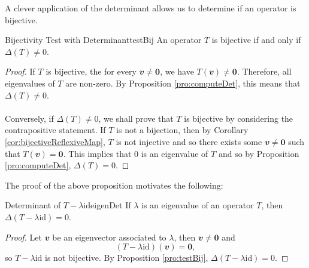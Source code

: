 \documentclass[math, code]{amznotes}
\theoremstyle{remark}
\newcommand{\zero}{\mathbf{0}}
\begin{document}
A clever application of the determinant allows us to determine if an operator is bijective.
\begin{probox}{Bijectivity Test with Determinant}{testBij}
    An operator $T$ is bijective if and only if $\Delta(T) \neq 0$.
    \tcblower
    \begin{proof}
        If $T$ is bijective, the for every $\mathbfit{v} \neq \zero$, we have $T(\mathbfit{v}) \neq \zero$. Therefore, all eigenvalues of $T$ are non-zero. By Proposition \ref{pro:computeDet}, this means that $\Delta(T) \neq 0$.
        \\\\
        Conversely, if $\Delta(T) \neq 0$, we shall prove that $T$ is bijective by considering the contrapositive statement. If $T$ is not a bijection, then by Corollary \ref{cor:bijectiveReflexiveMap}, $T$ is not injective and so there exists some $\mathbfit{v} \neq \zero$ such that $T(\mathbfit{v}) = \zero$. This implies that $0$ is an eigenvalue of $T$ and so by Proposition \ref{pro:computeDet}, $\Delta(T) = 0$.
    \end{proof}
\end{probox}
The proof of the above proposition motivates the following:
\begin{corbox}{Determinant of $T - \lambda\mathrm{id}$}{eigenDet}
    If $\lambda$ is an eigenvalue of an operator $T$, then $\Delta(T - \lambda\mathrm{id}) = 0$.
    \tcblower
    \begin{proof}
        Let $\mathbfit{v}$ be an eigenvector associated to $\lambda$, then $\mathbfit{v} \neq \zero$ and
        \begin{equation*}
            (T - \lambda\mathrm{id})(\mathbfit{v}) = \zero,
        \end{equation*}
        so $T - \lambda\mathrm{id}$ is not bijective. By Proposition \ref{pro:testBij}, $\Delta(T - \lambda\mathrm{id}) = 0$.
    \end{proof}
\end{corbox}
\end{document}
